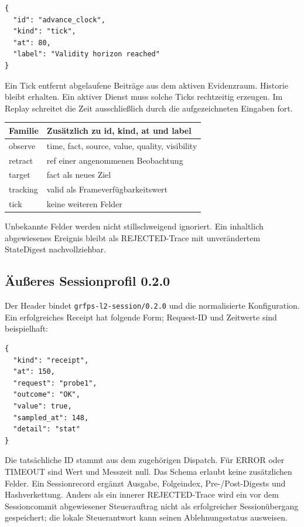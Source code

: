 \documentclass[11pt,a4paper]{article}
\begin{document}
\begin{lstlisting}
{
  "id": "advance_clock",
  "kind": "tick",
  "at": 80,
  "label": "Validity horizon reached"
}
\end{lstlisting}
Ein Tick entfernt abgelaufene Beiträge aus dem aktiven
Evidenzraum. Historie bleibt erhalten. Ein aktiver Dienst muss
solche Ticks rechtzeitig erzeugen. Im Replay schreitet die Zeit
ausschließlich durch die aufgezeichneten Eingaben fort.

\begin{tabularx}{\linewidth}{@{}lY@{}}
\toprule
Familie & Zusätzlich zu id, kind, at und label\\\midrule
observe & time, fact, source, value, quality, visibility\\
retract & ref einer angenommenen Beobachtung\\
target & fact als neues Ziel\\
tracking & valid als Frameverfügbarkeitswert\\
tick & keine weiteren Felder\\
\bottomrule
\end{tabularx}
Unbekannte Felder werden nicht stillschweigend ignoriert.
Ein inhaltlich abgewiesenes Ereignis bleibt als REJECTED-Trace
mit unverändertem StateDigest nachvollziehbar.


\clearpage
\subsection{Äußeres Sessionprofil 0.2.0}
Der Header bindet \texttt{grfps-l2-session/0.2.0} und die
normalisierte Konfiguration. Ein erfolgreiches Receipt hat
folgende Form; Request-ID und Zeitwerte sind beispielhaft:
\begin{lstlisting}
{
  "kind": "receipt",
  "at": 150,
  "request": "probe1",
  "outcome": "OK",
  "value": true,
  "sampled_at": 148,
  "detail": "stat"
}
\end{lstlisting}
Die tatsächliche ID stammt aus dem zugehörigen Dispatch.
Für ERROR oder TIMEOUT sind Wert und Messzeit null.
Das Schema erlaubt keine zusätzlichen Felder.
Ein Sessionrecord ergänzt Ausgabe, Folgeindex, Pre-/Post-Digests
und Hashverkettung. Anders als ein innerer REJECTED-Trace
wird ein vor dem Sessioncommit abgewiesener Steuerauftrag
nicht als erfolgreicher Sessionübergang gespeichert; die lokale
Steuerantwort kann seinen Ablehnungsstatus ausweisen.


\clearpage
\end{document}
